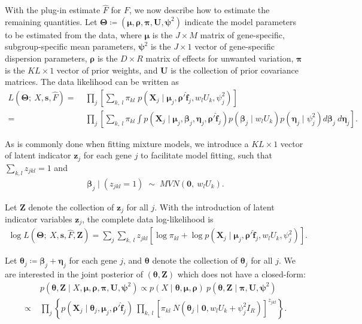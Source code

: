 \documentclass[onefignum,onetabnum,oneeqnum,final]{siamart190516}
\begin{document}
With the plug-in estimate $\hat{F}$ for $F$, we now describe how to estimate the remaining quantities. Let $\bm{\Theta} \coloneqq \left( \bm{\mu}, \bm{\rho},  \bm{\pi}, \bm{U}, \bm{\psi}^2 \right)$ indicate the model parameters to be estimated from the data, where $\bm{\mu}$ is the $J \times M$ matrix of gene-specific, subgroup-specific mean parameters, $\bm{\psi}^2$ is the $J \times 1$ vector of gene-specific dispersion parameters, $\bm{\rho}$ is the $D \times R$ matrix of effects for unwanted variation, $\bm{\pi} $ is the $KL \times 1$ vector of prior weights, and $\bm{U}$ is the collection of prior covariance matrices. The data likelihood can be written as 
\begin{align}
L(\bm{\Theta}; \: X, \bm{s}, \hat{F})  =  & \; \prod_j \left[ \sum_{k, \: l} \pi_{kl} \; p\left(\bm{X}_j \mid \bm{\mu}_j, \bm{\rho}' \hat{\bm{f}}_j, w_l U_k, \psi_j^2  \right) \right] \label{eq:5} \\
= & \; \prod_j \left[ \sum_{k, \: l} \pi_{kl} \int p\left(\bm{X}_j \mid \bm{\mu}_j, \bm{\beta}_j, \bm{\eta}_j, \bm{\rho}' \hat{\bm{f}}_j \right) p\left(\bm{\beta}_j \mid w_l U_k \right) p\left(\bm{\eta}_j \mid \psi_j^2 \right) d \bm{\beta}_j \: d \bm{\eta}_j \right]. \label{eq:6}
\end{align}

As is commonly done when fitting mixture models, we introduce a $KL \times 1$ vector of latent indicator $\bm{z}_j$ for each gene $j$ to facilitate model fitting, such that $\sum_{k,l} z_{jkl} = 1$ and 
\begin{align}
\bm{\beta}_j \mid (z_{jkl} = 1) \; \sim  \; MVN(\bm{0},  \: w_l U_k).  \label{eq:7}
\end{align}

Let $\bm{Z}$ denote the collection of $\bm{z}_j$ for all $j$. With the introduction of latent indicator variables $\bm{z}_j$,  the complete data log-likelihood is
\begin{align}
\log L(\bm{\Theta}; \: X, \bm{s}, \hat{F},  \bm{Z}) = \sum_j \sum_{k, \: l} z_{jkl} \left[ \log \pi_{kl} + \log p\left(\bm{X}_j \mid \bm{\mu}_j,  \bm{\rho}' \hat{\bm{f}}_j, w_l U_k, \psi_j^2 \right) \right].  \label{eq:8} 
\end{align}

Let $\bm{\theta}_j \coloneqq \bm{\beta}_j + \bm{\eta}_j$ for each gene $j$, and $\bm{\theta}$ denote the collection of $\bm{\theta}_j$ for all $j$.  We are interested in the joint posterior of $(\bm{\theta}, \bm{Z})$ which does not have a closed-form:
\begin{align} \label{eq:9}
& \; p\left(\bm{\theta}, \bm{Z} \mid X, \bm{\mu}, \bm{\rho}, \bm{\pi}, \bm{U},  \bm{\psi}^2 \right) \propto p\left(X \mid \bm{\theta},  \bm{\mu}, \bm{\rho} \right) \: p\left(\bm{\theta}, \bm{Z} \mid  \bm{\pi}, \bm{U}, \bm{\psi}^2 \right)  \\
\propto & \; \prod_j \left\{ p\left(\bm{X}_j \mid \bm{\theta}_j, \bm{\mu}_j, \bm{\rho}' \hat{\bm{f}}_j \right) \:  \prod_{k, \: l} \left[\pi_{kl} \: N\left(\bm{\theta}_j \mid \bm{0}, w_l U_k + \psi_j^2 I_R \right) \right]^{z_{jkl}} \right\}. \nonumber
\end{align}
\end{document}
